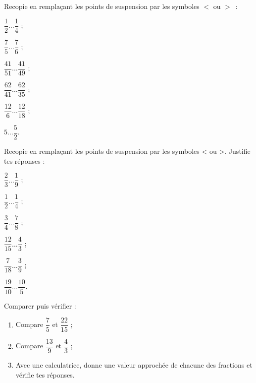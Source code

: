 \begin{exercice}
Recopie en remplaçant les points de suspension par les symboles $<$ ou $>$ :
\begin{colenumerate}{3}
 \item $\dfrac{1}{2} \ldots \dfrac{1}{4}$ ; 
 \vspace{0.2cm}
 \item $\dfrac{7}{5} \ldots \dfrac{7}{6}$ ; 
 \item $\dfrac{41}{51} \ldots \dfrac{41}{49}$ ; 
 \item $\dfrac{62}{41} \ldots \dfrac{62}{35}$ ; 
 \item $\dfrac{12}{6} \ldots \dfrac{12}{18}$ ; 
 \item $5 \ldots \dfrac{5}{2}$.
 \end{colenumerate}
\end{exercice}


\begin{exercice}
Recopie en remplaçant les points de suspension par les symboles < ou >. Justifie tes réponses :
\begin{colenumerate}{3}
 \item $\dfrac{2}{3} \ldots \dfrac{1}{9}$ ; 
 \vspace{0.2cm}
 \item $\dfrac{1}{2} \ldots \dfrac{1}{4}$ ; 
 \item $\dfrac{3}{4} \ldots \dfrac{7}{8}$ ; 
 \item $\dfrac{12}{15} \ldots \dfrac{4}{3}$ ; 
 \item $\dfrac{7}{18} \ldots \dfrac{3}{9}$ ; 
 \item $\dfrac{19}{10} \ldots \dfrac{10}{5}$.
 \end{colenumerate}
\end{exercice}


\begin{exercice}
Comparer puis vérifier :
\begin{enumerate}
  \item Compare $\dfrac{7}{5}$ et $\dfrac{22}{15}$ ;
  \item Compare $\dfrac{13}{9}$ et $\dfrac{4}{3}$ ;
  \item Avec une calculatrice, donne une valeur approchée de chacune des fractions et vérifie tes réponses.
 \end{enumerate}
\end{exercice}


